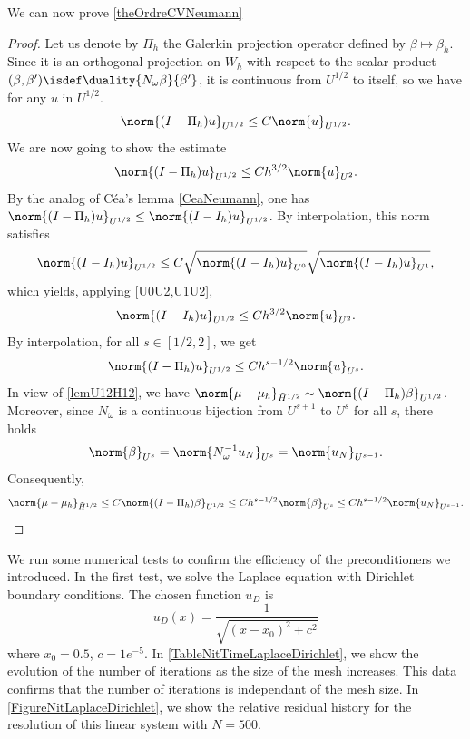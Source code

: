 \documentclass[a4paper]{article}
\begin{document}
\noindent We can now prove \autoref{theOrdreCVNeumann}
\begin{proof}
	Let us denote by $\Pi_h$ the Galerkin projection operator defined by $\beta \mapsto \beta_h$. Since it is an orthogonal projection on $W_h$ with respect to the scalar product $(\beta,\beta') \isdef \duality{N_\omega \beta}{\beta'}$, it is continuous from $U^{1/2}$ to itself, so we have for any $u$ in $U^{1/2}$. 
	\[\norm{(I - \Pi_h)u}_{U^{1/2}} \leq C \norm{u}_{U^{1/2}}.\]
	We are now going to show the estimate
	\[\norm{(I - \Pi_h)u}_{U^{1/2}} \leq C h^{3/2} \norm{u}_{U^{2}}.\]
	By the analog of Céa's lemma \autoref{CeaNeumann}, one has $\norm{(I-\Pi_h)u}_{U^{1/2}} \leq \norm{(I - I_h) u}_{U^{1/2}}$. By interpolation, this norm satisfies
	\[\norm{(I - I_h)u}_{U^{1/2}} \leq C \sqrt{\norm{(I - I_h)u}_{U^{0}}}\sqrt{\norm{(I - I_h)u}_{U^{1}}},\]
	which yields, applying \autoref{U0U2,U1U2},
	\[\norm{(I - I_h)u}_{U^{1/2}} \leq C h^{3/2} \norm{u}_{U^2}.\]
	By interpolation, for all $s \in [1/2,2]$, we get
	\[\norm{(I - \Pi_h)u}_{U^{1/2}} \leq C h^{s - 1/2} \norm{u}_{U^s}.\]
	In view of \autoref{lemU12H12}, we have $\norm{\mu - \mu_h}_{\tilde{H}^{1/2}} \sim \norm{(I - \Pi_h)\beta}_{U^{1/2}}$. Moreover, since $N_\omega$ is a continuous bijection from $U^{s+1}$ to $U^s$ for all $s$, there holds
	\[\norm{\beta}_{U^s} = \norm{N_\omega^{-1} u_N}_{U^s} = \norm{u_N}_{U^{s-1}}.\]
	Consequently, 
	\[\norm{\mu - \mu_h}_{\tilde{H}^{1/2}} \leq  C\norm{(I - \Pi_h)\beta}_{U^{1/2}} \leq C h^{s - 1/2} \norm{\beta}_{U^s} \leq C h^{s - 1/2} \norm{u_N}_{U^{s-1}}.\]
\end{proof}


We run some numerical tests to confirm the efficiency of the preconditioners we introduced. In the first test, we solve the Laplace equation with Dirichlet boundary conditions. The chosen function $u_D$ is
 \[u_D(x) = \frac{1}{\sqrt{(x - x_0)^2 + c^2}}\]  
where $x_0 = 0.5$, $c = 1e^{-5}$. In \autoref{TableNitTimeLaplaceDirichlet}, we show the evolution of the number of iterations as the size of the mesh increases. This data confirms that the number of iterations is independant of the mesh size. In \autoref{FigureNitLaplaceDirichlet}, we show the relative residual history for the resolution of this linear system with $N = 500$. 
\end{document}
